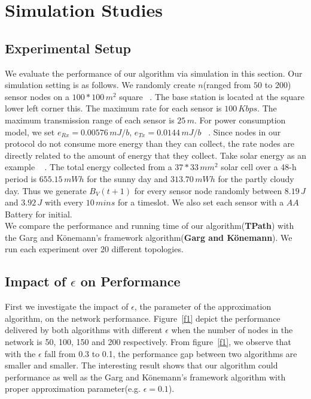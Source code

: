\documentclass{article}
\begin{document}
\section{Simulation Studies}
\subsection{Experimental Setup}
We evaluate the performance of our algorithm via simulation in this section.
Our simulation setting is as follows. We randomly create $n$(ranged from $50$ to $200$) sensor nodes
on a $100*100\,m^2$ square ~\cite{Maxi}. The base station is located at the square lower left corner this. The maximum rate for each sensor is $100\,Kbps$. The maximum transmission range of each sensor is $25\,m$. For power consumption model, we set $e_{Rx} = 0.00576\,mJ/b$, $e_{Tx} = 0.0144\,mJ/b$ ~\cite{Ene}. Since nodes in our protocol do not 
consume more energy than they can collect, the rate nodes are directly related to the amount of energy that they collect. Take solar energy as an example ~\cite{Ste} . The total energy collected from a $37 * 33\,mm^2$ solar cell over a 48-h period is $655.15\,mWh$ for the sunny day and $313.70\,mWh$ for the partly cloudy day. Thus we generate $B_V(t+1)$ for every sensor node randomly between $8.19\,J$ and $3.92\,J$ with every $10\,mins$ for a timeslot. We also set each sensor with a $AA$ Battery for initial.\\
We compare the performance and running time of our algorithm(\textbf{TPath}) with the Garg and K\"{o}nemann's framework algorithm(\textbf{Garg and K\"{o}nemann}). We run each experiment over 20 different topologies.

\subsection{Impact of $\epsilon$ on Performance}
First we investigate the impact of $\epsilon$, the parameter of the approximation algorithm, on the network performance. Figure~\ref{f1} depict the performance delivered by both algorithms with different $\epsilon$ when the number of nodes in the network is 50, 100, 150 and 200 respectively. From figure~\ref{f1}, we observe that with the $\epsilon$ fall from 0.3 to 0.1, the performance gap between two algorithms are smaller and smaller. The interesting result shows that our algorithm could performance as well as the Garg and K\"{o}nemann's framework algorithm with proper approximation parameter(e.g. $\epsilon = 0.1$).
\end{document}
